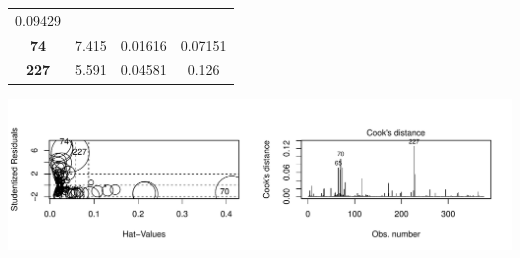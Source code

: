 \documentclass[]{elsarticle} %
\makeatletter
\def\maxwidth{\ifdim\Gin@nat@width>\linewidth\linewidth
\else\Gin@nat@width\fi}
\let\Oldincludegraphics\includegraphics
\renewcommand{\includegraphics}[1]{\Oldincludegraphics[width=\maxwidth]{#1}}
\makeatother
\begin{document}
\begin{longtable}[]{@{}cccc@{}}
\begin{minipage}[t]{0.10\columnwidth}
0.09429\strut
\end{minipage}\tabularnewline
\begin{minipage}[t]{0.12\columnwidth}\centering\strut
\textbf{74}\strut
\end{minipage} & \begin{minipage}[t]{0.12\columnwidth}\centering\strut
7.415\strut
\end{minipage} & \begin{minipage}[t]{0.10\columnwidth}\centering\strut
0.01616\strut
\end{minipage} & \begin{minipage}[t]{0.10\columnwidth}\centering\strut
0.07151\strut
\end{minipage}\tabularnewline
\begin{minipage}[t]{0.12\columnwidth}\centering\strut
\textbf{227}\strut
\end{minipage} & \begin{minipage}[t]{0.12\columnwidth}\centering\strut
5.591\strut
\end{minipage} & \begin{minipage}[t]{0.10\columnwidth}\centering\strut
0.04581\strut
\end{minipage} & \begin{minipage}[t]{0.10\columnwidth}\centering\strut
0.126\strut
\end{minipage}\tabularnewline
\bottomrule
\end{longtable}

\includegraphics{Final_Project_files/figure-latex/unnamed-chunk-12-1.pdf}
\end{document}
